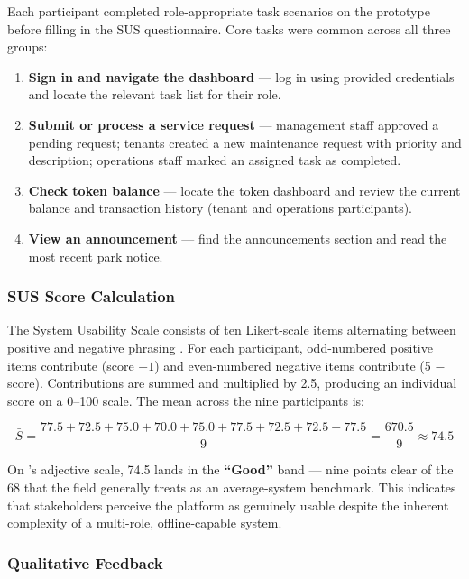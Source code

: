 Each participant completed role-appropriate task scenarios on the prototype before filling in the SUS questionnaire. Core tasks were common across all three groups:

\begin{enumerate}

\item \textbf{Sign in and navigate the dashboard} --- log in using provided credentials and locate the relevant task list for their role.

\item \textbf{Submit or process a service request} --- management staff approved a pending request; tenants created a new maintenance request with priority and description; operations staff marked an assigned task as completed.

\item \textbf{Check token balance} --- locate the token dashboard and review the current balance and transaction history (tenant and operations participants).

\item \textbf{View an announcement} --- find the announcements section and read the most recent park notice.

\end{enumerate}

\subsubsection{SUS Score Calculation}

The System Usability Scale consists of ten Likert-scale items alternating between positive and negative phrasing \citep{Brooke1996}. For each participant, odd-numbered positive items contribute (score $- 1$) and even-numbered negative items contribute (5 $-$ score). Contributions are summed and multiplied by 2.5, producing an individual score on a 0--100 scale. The mean across the nine participants is:

\[
\bar{S} = \frac{77.5 + 72.5 + 75.0 + 70.0 + 75.0 + 77.5 + 72.5 + 72.5 + 77.5}{9} = \frac{670.5}{9} \approx \mathbf{74.5}
\]

On \citet{Bangor2009}'s adjective scale, 74.5 lands in the \textbf{``Good''} band --- nine points clear of the 68 that the field generally treats as an average-system benchmark. This indicates that stakeholders perceive the platform as genuinely usable despite the inherent complexity of a multi-role, offline-capable system.

\subsubsection{Qualitative Feedback}

